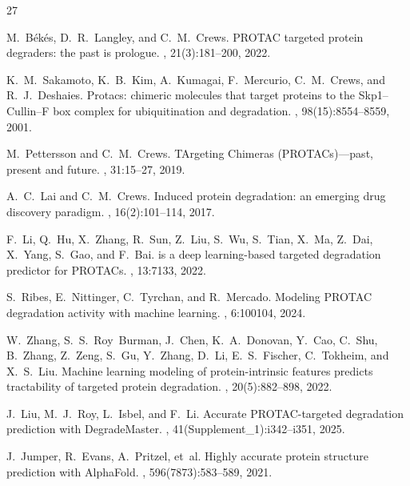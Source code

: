 \documentclass[sigconf]{acmart}
\begin{document}
\begin{thebibliography}{27}

M.~B\'{e}k\'{e}s, D.~R.~Langley, and C.~M.~Crews.
\newblock PROTAC targeted protein degraders: the past is prologue.
, 21(3):181--200, 2022.

K.~M.~Sakamoto, K.~B.~Kim, A.~Kumagai, F.~Mercurio, C.~M.~Crews, and R.~J.~Deshaies.
\newblock Protacs: chimeric molecules that target proteins to the {Skp1--Cullin--F} box complex for ubiquitination and degradation.
, 98(15):8554--8559, 2001.

M.~Pettersson and C.~M.~Crews.
 {TArgeting} {Chimeras} ({PROTACs})---past, present and future.
, 31:15--27, 2019.

A.~C.~Lai and C.~M.~Crews.
\newblock Induced protein degradation: an emerging drug discovery paradigm.
, 16(2):101--114, 2017.

F.~Li, Q.~Hu, X.~Zhang, R.~Sun, Z.~Liu, S.~Wu, S.~Tian, X.~Ma, Z.~Dai, X.~Yang, S.~Gao, and F.~Bai.
 is a deep learning-based targeted degradation predictor for {PROTACs}.
, 13:7133, 2022.

S.~Ribes, E.~Nittinger, C.~Tyrchan, and R.~Mercado.
\newblock Modeling {PROTAC} degradation activity with machine learning.
, 6:100104, 2024.

W.~Zhang, S.~S.~Roy~Burman, J.~Chen, K.~A.~Donovan, Y.~Cao, C.~Shu, B.~Zhang, Z.~Zeng, S.~Gu, Y.~Zhang, D.~Li, E.~S.~Fischer, C.~Tokheim, and X.~S.~Liu.
\newblock Machine learning modeling of protein-intrinsic features predicts tractability of targeted protein degradation.
, 20(5):882--898, 2022.

J.~Liu, M.~J.~Roy, L.~Isbel, and F.~Li.
\newblock Accurate {PROTAC}-targeted degradation prediction with {DegradeMaster}.
, 41(Supplement\_1):i342--i351, 2025.

J.~Jumper, R.~Evans, A.~Pritzel, et~al.
\newblock Highly accurate protein structure prediction with {AlphaFold}.
, 596(7873):583--589, 2021.


\end{thebibliography}
\end{document}
